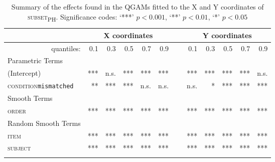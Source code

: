 \begin{table}\fontsize{9}{10}
\caption{Summary of the effects found in the QGAMs fitted to the X and Y coordinates of \textsc{subset\textsubscript{PH}}. Significance codes: `***' $p < 0.001$, `**' $p < 0.01$, `*' $p < 0.05$}
\label{tab:8.9}
\centering
\begin{tabular}{lrrrrrrrrrrr}
\lsptoprule
~                   & \multicolumn{5}{c}{X coordinates}       & \multicolumn{1}{c}{}                       & \multicolumn{5}{c}{Y coordinates}                               \\
\midrule
\multicolumn{1}{r}{quantiles:}          & 0.1        & 0.3        & 0.5        & 0.7        & 0.9  & ~       & 0.1        & 0.3        & 0.5        & 0.7        & 0.9         \\
\midrule
Parametric Terms    & \textbf{~} & \textbf{~} & \textbf{~} & \textbf{~} & \textbf{~} & \textbf{~} & \textbf{~} & \textbf{~} & \textbf{~} & \textbf{~}  \\
\midrule
(Intercept)         & ***        & n.s.         & ***        & ***        & *** & ~       & ***        & ***        & ***        & ***        & n.s.          \\
\textsc{condition}\texttt{mismatched} & **       & ***          & ***        & n.s.        & n.s.    & ~    & n.s.       & *        & ***        & ***        & ***         \\
\midrule
Smooth Terms        & \textbf{~} & \textbf{~} & \textbf{~} & \textbf{~} & \textbf{~} & \textbf{~} & \textbf{~} & \textbf{~} & \textbf{~} & \textbf{~}  \\
\midrule
\textsc{order}               & ***        & ***        & ***        & ***        & ***   & ~     & ***        & ***        & ***        & ***        & ***         \\
\midrule
Random Smooth Terms & \textbf{~} & \textbf{~} & \textbf{~} & \textbf{~} & \textbf{~} & \textbf{~} & \textbf{~} & \textbf{~} & \textbf{~} & \textbf{~}  \\
\midrule
\textsc{item}                & ***        & ***        & ***        & ***        & ***   & ~     & ***        & ***        & ***        & ***        & ***         \\
\textsc{subject}             & ***        & ***        & ***        & ***        & ***  & ~      & ***        & ***        & ***        & ***        & ***        \\
\lspbottomrule
\end{tabular}
\end{table}

